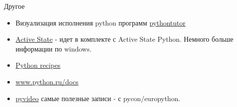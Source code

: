 \documentclass{article}
\begin{document}
\begin{center} Другое \end{center}
\begin{itemize}
	\item Визуализация исполнения python программ 
			\href{http://www.pythontutor.com/visualize.html}{pythontutor}
	\item \href{http://www.activestate.com/activepython}{Active State} - идет в комплекте
	      с Active State Python. Немного больше информации по windows. 
	\item \href{http://code.activestate.com/recipes/langs/python/}{Python recipes}
	\item \href{http://www.python.ru/docs/}{www.python.ru/docs}
	\item \href{http://pyvideo.org/}{pyvideo} самые полезные записи - с pycon/europython.
\end{itemize}

\end{document}
